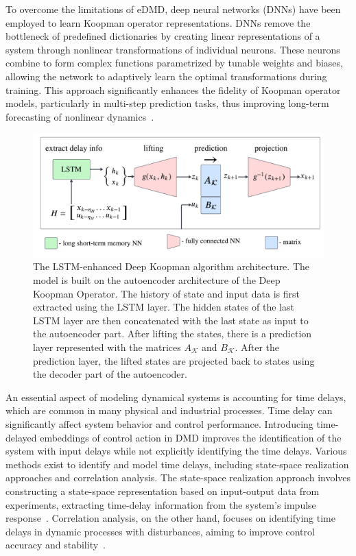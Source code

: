 \documentclass[conference]{IEEEtran}
\begin{document}
To overcome the limitations of eDMD, deep neural networks (DNNs) have been employed to learn Koopman operator representations. DNNs remove the bottleneck of predefined dictionaries by creating linear representations of a system through nonlinear transformations of individual neurons. These neurons combine to form complex functions parametrized by tunable weights and biases, allowing the network to adaptively learn the optimal transformations during training. This approach significantly enhances the fidelity of Koopman operator models, particularly in multi-step prediction tasks, thus improving long-term forecasting of nonlinear dynamics~\cite{Yeung2019}.
\begin{figure}\label{fig:LSTM-enhanced Deep Koopman_scheme}
    \centerline{\includegraphics[width = \linewidth]{figures/derek_scheme.pdf}}
    \caption{The LSTM-enhanced Deep Koopman algorithm architecture. The model is built on the autoencoder architecture of the Deep Koopman Operator. The history of state and input data is first extracted using the LSTM layer. The hidden states of the last LSTM layer are then concatenated with the last state as input to the autoencoder part. After lifting the states, there is a prediction layer represented with the matrices \(A_\mathcal{K}\) and \(B_\mathcal{K}\). After the prediction layer, the lifted states are projected back to states using the decoder part of the autoencoder.}
\end{figure}
An essential aspect of modeling dynamical systems is accounting for time delays, which are common in many physical and industrial processes. Time delay can significantly affect system behavior and control performance. Introducing time-delayed embeddings of control action in DMD improves the identification of the system with input delays while not explicitly identifying the time delays. Various methods exist to identify and model time delays, including state-space realization approaches and correlation analysis. The state-space realization approach involves constructing a state-space representation based on input-output data from experiments, extracting time-delay information from the system's impulse response~\cite{Lima2015254}. Correlation analysis, on the other hand, focuses on identifying time delays in dynamic processes with disturbances, aiming to improve control accuracy and stability~\cite{Li201792}.
\end{document}

